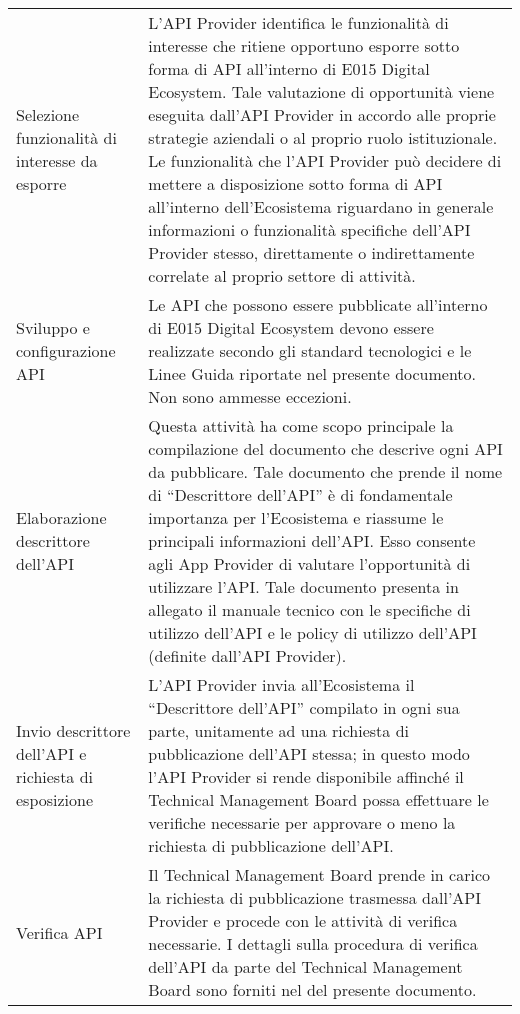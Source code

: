 \documentclass[letterpaper,10pt,italian]{sphinxmanual}
\begin{document}
\begin{savenotes}\sphinxattablestart
\centering
{}
\label{\detokenize{process:id2}}
\sphinxaftercaption
\begin{tabulary}{\linewidth}[t]{|T|T|}
\hline
{}\relax &\relax \\
\hline
Selezione funzionalità di interesse da esporre
&
L’API Provider identifica le funzionalità di interesse che ritiene opportuno esporre sotto forma di API all’interno di E015 Digital Ecosystem. Tale valutazione di opportunità viene eseguita dall’API Provider in accordo alle proprie strategie aziendali o al proprio ruolo istituzionale. Le funzionalità che l’API Provider può decidere di mettere a disposizione sotto forma di API all’interno dell’Ecosistema riguardano in generale informazioni o funzionalità specifiche dell’API Provider stesso, direttamente o indirettamente correlate al proprio settore di attività.
\\
\hline
Sviluppo e configurazione API
&
Le API che possono essere pubblicate all’interno di E015 Digital Ecosystem devono essere realizzate secondo gli standard tecnologici e le Linee Guida riportate nel presente documento. Non sono ammesse eccezioni.
\\
\hline
Elaborazione descrittore dell’API
&
Questa attività ha come scopo principale la compilazione del documento che descrive ogni API da pubblicare. Tale documento \textendash{} che prende il nome di “Descrittore dell’API” \textendash{} è di fondamentale importanza per l’Ecosistema e riassume le principali informazioni dell’API. Esso consente agli App Provider di valutare l’opportunità di utilizzare l’API. Tale documento presenta in allegato il manuale tecnico con le specifiche di utilizzo dell’API e le policy di utilizzo dell’API (definite dall’API Provider).
\\
\hline
Invio descrittore dell’API e richiesta di esposizione
&
L’API Provider invia all’Ecosistema il “Descrittore dell’API” compilato in ogni sua parte, unitamente ad una richiesta di pubblicazione dell’API stessa; in questo modo l’API Provider si rende disponibile affinché il Technical Management Board possa effettuare le verifiche necessarie per approvare o meno la richiesta di pubblicazione dell’API.
\\
\hline
Verifica API
&
Il Technical Management Board prende in carico la richiesta di pubblicazione trasmessa dall’API Provider e procede con le attività di verifica necessarie. I dettagli sulla procedura di verifica dell’API da parte del Technical Management Board sono forniti nel {\hyperref[\detokenize{verificheTMB:capitolo3}]{}} del presente documento.

\end{tabulary}
\end{savenotes}
\end{document}
